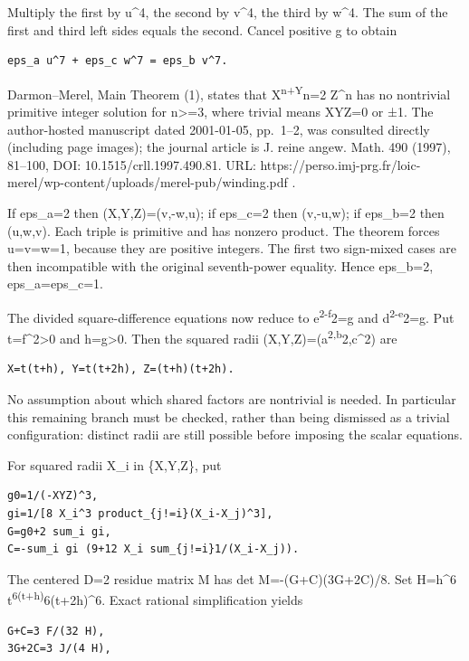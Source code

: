\documentclass[
  10pt,
]{article}
\begin{document}
Multiply the first by u\^{}4, the second by v\^{}4, the third by w\^{}4.
The sum of the first and third left sides equals the second. Cancel
positive g to obtain

\begin{verbatim}
eps_a u^7 + eps_c w^7 = eps_b v^7.
\end{verbatim}

Darmon--Merel, Main Theorem (1), states that X\textsuperscript{n+Y}n=2
Z\^{}n has no nontrivial primitive integer solution for n\textgreater=3,
where trivial means XYZ=0 or ±1. The author-hosted manuscript dated
2001-01-05, pp.~1--2, was consulted directly (including page images);
the journal article is J. reine angew. Math. 490 (1997), 81--100, DOI:
10.1515/crll.1997.490.81. URL:
https://perso.imj-prg.fr/loic-merel/wp-content/uploads/merel-pub/winding.pdf
.

If eps\_a=2 then (X,Y,Z)=(v,-w,u); if eps\_c=2 then (v,-u,w); if
eps\_b=2 then (u,w,v). Each triple is primitive and has nonzero product.
The theorem forces u=v=w=1, because they are positive integers. The
first two sign-mixed cases are then incompatible with the original
seventh-power equality. Hence eps\_b=2, eps\_a=eps\_c=1.

The divided square-difference equations now reduce to
e\textsuperscript{2-f}2=g and d\textsuperscript{2-e}2=g. Put
t=f\^{}2\textgreater0 and h=g\textgreater0. Then the squared radii
(X,Y,Z)=(a\textsuperscript{2,b}2,c\^{}2) are

\begin{verbatim}
X=t(t+h), Y=t(t+2h), Z=(t+h)(t+2h).
\end{verbatim}

No assumption about which shared factors are nontrivial is needed. In
particular this remaining branch must be checked, rather than being
dismissed as a trivial configuration: distinct radii are still possible
before imposing the scalar equations.

For squared radii X\_i in \{X,Y,Z\}, put

\begin{verbatim}
g0=1/(-XYZ)^3,
gi=1/[8 X_i^3 product_{j!=i}(X_i-X_j)^3],
G=g0+2 sum_i gi,
C=-sum_i gi (9+12 X_i sum_{j!=i}1/(X_i-X_j)).
\end{verbatim}

The centered D=2 residue matrix M has det M=-(G+C)(3G+2C)/8. Set
H=h\^{}6 t\textsuperscript{6(t+h)}6(t+2h)\^{}6. Exact rational
simplification yields

\begin{verbatim}
G+C=3 F/(32 H),
3G+2C=3 J/(4 H),
\end{verbatim}
\end{document}
